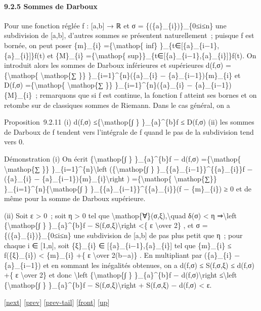 \documentclass[]{article}
\begin{document}
\paragraph{9.2.5 Sommes de Darboux}

Pour une fonction réglée f : {[}a,b{]} → ℝ et σ =
\{(\{a\}\_\{i\})\}\_\{0≤i≤n\} une subdivision de {[}a,b{]}, d'autres
sommes se présentent naturellement~; puisque f est bornée, on peut poser
\{m\}\_\{i\} =\{\textbackslash{}mathop\{ inf\}
\}\_\{t∈{[}\{a\}\_\{i−1\},\{a\}\_\{i\}{]}\}f(t) et \{M\}\_\{i\}
=\{\textbackslash{}mathop\{
sup\}\}\_\{t∈{[}\{a\}\_\{i−1\},\{a\}\_\{i\}{]}\}f(t). On introduit alors
les sommes de Darboux inférieures et supérieures d(f,σ)
=\{\textbackslash{}mathop\{ \textbackslash{}mathop\{∑ \}\}
\}\_\{i=1\}\^{}\{n\}(\{a\}\_\{i\} − \{a\}\_\{i−1\})\{m\}\_\{i\} et
D(f,σ) =\{\textbackslash{}mathop\{ \textbackslash{}mathop\{∑ \}\}
\}\_\{i=1\}\^{}\{n\}(\{a\}\_\{i\} − \{a\}\_\{i−1\})\{M\}\_\{i\}~;
remarquons que si f est continue, la fonction f atteint ses bornes et on
retombe sur de classiques sommes de Riemann. Dans le cas général, on a

Proposition~9.2.11 (i) d(f,σ) ≤\{\textbackslash{}mathop\{∫ \}
\}\_\{a\}\^{}\{b\}f ≤ D(f,σ) (ii) les sommes de Darboux de f tendent
vers l'intégrale de f quand le pas de la subdivision tend vers 0.

Démonstration (i) On écrit \{\textbackslash{}mathop\{∫ \}
\}\_\{a\}\^{}\{b\}f − d(f,σ) =\{\textbackslash{}mathop\{
\textbackslash{}mathop\{∑ \}\} \}\_\{i=1\}\^{}\{n\}\textbackslash{}left
(\{\textbackslash{}mathop\{∫ \}
\}\_\{\{a\}\_\{i−1\}\}\^{}\{\{a\}\_\{i\}\}f − (\{a\}\_\{i\} −
\{a\}\_\{i−1\})\{m\}\_\{i\}\textbackslash{}right )
=\{\textbackslash{}mathop\{ \textbackslash{}mathop\{∑\}\}
\}\_\{i=1\}\^{}\{n\}\{\textbackslash{}mathop\{∫ \}
\}\_\{\{a\}\_\{i−1\}\}\^{}\{\{a\}\_\{i\}\}(f − \{m\}\_\{i\}) ≥ 0 et de
même pour la somme de Darboux supérieure.

(ii) Soit ε \textgreater{} 0~; soit η \textgreater{} 0 tel que
\textbackslash{}mathop\{∀\}(σ,ξ),\textbackslash{}quad δ(σ) \textless{} η
⇒\textbackslash{}left \textbar{}\{\textbackslash{}mathop\{∫ \}
\}\_\{a\}\^{}\{b\}f − S(f,σ,ξ)\textbackslash{}right \textbar{}
\textless{}\{ ε \textbackslash{}over 2\} , et σ =
\{(\{a\}\_\{i\})\}\_\{0≤i≤n\} une subdivision de {[}a,b{]} de pas plus
petit que η~; pour chaque i ∈ {[}1,n{]}, soit \{ξ\}\_\{i\} ∈
{[}\{a\}\_\{i−1\},\{a\}\_\{i\}{]} tel que \{m\}\_\{i\} ≤ f(\{ξ\}\_\{i\})
\textless{} \{m\}\_\{i\} +\{ ε \textbackslash{}over 2(b−a)\} . En
multipliant par (\{a\}\_\{i\} − \{a\}\_\{i−1\}) et en sommant les
inégalités obtenues, on a d(f,σ) ≤ S(f,σ,ξ) ≤ d(f,σ) +\{ ε
\textbackslash{}over 2\} et donc \textbackslash{}left
\textbar{}\{\textbackslash{}mathop\{∫ \} \}\_\{a\}\^{}\{b\}f −
d(f,σ)\textbackslash{}right \textbar{}≤\textbackslash{}left
\textbar{}\{\textbackslash{}mathop\{∫ \} \}\_\{a\}\^{}\{b\}f −
S(f,σ,ξ)\textbackslash{}right \textbar{} + \textbar{}S(f,σ,ξ) −
d(f,σ)\textbar{} \textless{} ε.

{[}\href{coursse52.html}{next}{]} {[}\href{coursse50.html}{prev}{]}
{[}\href{coursse50.html\#tailcoursse50.html}{prev-tail}{]}
{[}\href{coursse51.html}{front}{]}
{[}\href{coursch10.html\#coursse51.html}{up}{]}
\end{document}
